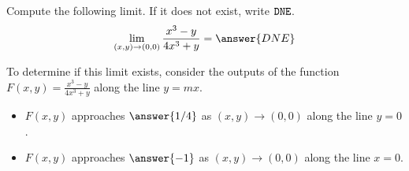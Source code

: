 \documentclass{ximera}
\author{Jim Talamo \and Bart Snapp}
\newcommand{\point}[1]{\left(#1\right)} %
\begin{document}
\begin{exercise}
  Compute the following limit. If it does not exist, write $\verb|DNE|$.
  \[
  \lim_{\point{x,y}\to \point{0,0}}\frac{x^3-y}{4x^3+y} = \answer{DNE}
  \]
 
 \begin{hint}
    To determine if this limit exists, consider the outputs of the function $F(x,y) =\frac{x^3-y}{4x^3+y}$ along the line $y = m x$.
    \begin{itemize}
    \item $F(x,y)$ approaches $\answer{1/4}$ as $\point{x,y} \to \point{0,0}$ along the line $y=0$.
    \item $F(x,y)$ approaches $\answer{-1}$ as $\point{x,y} \to \point{0,0}$ along the line $x=0$.
    \end{itemize}
\end{hint} 

\end{exercise}
\end{document}
